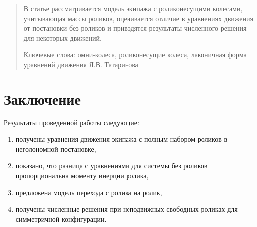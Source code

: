
\maketitle

\begin{abstract}
В статье рассматривается модель экипажа с роликонесущими колесами, учитывающая массы роликов, оценивается отличие в уравнениях движения от постановки без роликов и приводятся результаты численного решения для некоторых движений.

Ключевые слова: омни-колеса, роликонесущие колеса, лаконичная форма уравнений движения Я.В. Татаринова

\end{abstract}

\newpage













\section{Заключение}

Результаты проведенной работы следующие:
\begin{enumerate}
    \item получены уравнения движения экипажа с полным набором роликов в неголономной постановке,

    \item показано, что разница с уравнениями для системы без роликов пропорциональна моменту инерции ролика,

    \item предложена модель перехода с ролика на ролик,

    \item получены численные решения при неподвижных свободных роликах для симметричной конфигурации.
\end{enumerate}

